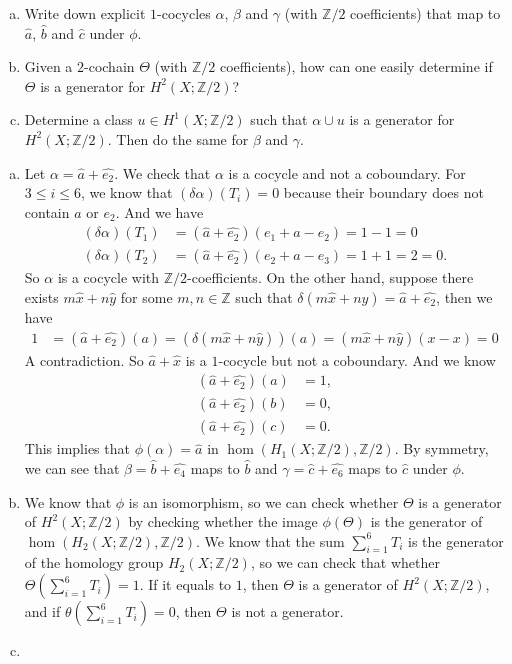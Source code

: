 \documentclass[letterpaper, 12pt]{article}
\begin{document}
\begin{problem}{6}
\begin{enumerate}[(a)]
\item Write down explicit \(1\)-cocycles \(\alpha\), \(\beta\) and \(\gamma\) (with \(\mathbb{Z}/2\) coefficients) that map to \(\hat{a}\), \(\hat{b}\) and \(\hat{c}\) under \(\phi\). 
\item Given a \(2\)-cochain \(\Theta\) (with \(\mathbb{Z}/2\) coefficients), how can one easily determine if \(\Theta\) is a generator for \(H^2(X;\mathbb{Z}/2)\)?
\item Determine a class \(u\in H^1(X;\mathbb{Z}/2)\) such that \(\alpha\cup u\) is a generator for \(H^2(X;\mathbb{Z}/2)\). Then do the same for \(\beta\) and \(\gamma\).
\end{enumerate}
\end{problem}
\begin{solution}
\begin{enumerate}[(a)]
\item Let \(\alpha=\hat{a}+\hat{e_2}\). We check that \(\alpha\) is a cocycle and not a coboundary. For \(3\leq i\leq 6\), we know that \((\delta\alpha)(T_i)=0\) because their boundary does not contain \(a\) or \(e_2\). And we have 
\begin{align*}
    (\delta\alpha)(T_1)&=(\hat{a}+\hat{e_2})(e_1+a-e_2)=1-1=0\\ 
    (\delta\alpha)(T_2)&=(\hat{a}+\hat{e_2})(e_2+a-e_3)=1+1=2=0.
\end{align*}
So \(\alpha\) is a cocycle with \(\mathbb{Z}/2\)-coefficients. On the other hand, suppose there exists \(m\hat{x}+n\hat{y}\) for some \(m,n\in \mathbb{Z}\) such that \(\delta(m\hat{x}+n\hat{y})=\hat{a}+\hat{e_2}\), then we have 
\begin{align*}
   1&=(\hat{a}+\hat{e_2})(a)=(\delta(m\hat{x}+n\hat{y}))(a)=(m\hat{x}+n\hat{y})(x-x)=0
\end{align*}
A contradiction. So \(\hat{a}+\hat{x}\) is a \(1\)-cocycle but not a coboundary. And we know 
\begin{align*}
    (\hat{a}+\hat{e_2})(a)&=1,\\
    (\hat{a}+\hat{e_2})(b)&=0,\\
    (\hat{a}+\hat{e_2})(c)&=0. 
\end{align*}
This implies that \(\phi(\alpha)=\hat{a}\) in \(\hom(H_1(X;\mathbb{Z}/2),\mathbb{Z}/2)\). By symmetry, we can see that 
\(\beta=\hat{b}+\hat{e_4}\) maps to \(\hat{b}\) and \(\gamma=\hat{c}+\hat{e_6}\) maps to \(\hat{c}\) under \(\phi\).
\item We know that \(\phi\) is an isomorphism, so we can check whether \(\Theta\) is a generator of \(H^2(X;\mathbb{Z}/2)\) by checking whether the image \(\phi(\Theta)\) is the generator of \(\hom(H_2(X;\mathbb{Z}/2),\mathbb{Z}/2)\). We know that the sum \(\sum_{i=1}^{6}T_i\) is the generator of the homology group \(H_2(X;\mathbb{Z}/2)\), so we can check that whether \(\Theta(\sum_{i=1}^{6}T_i)=1\). If it equals to \(1\), then \(\Theta\) is a generator of \(H^2(X;\mathbb{Z}/2)\), and if \(\theta(\sum_{i=1}^{6}T_i)=0\), then \(\Theta\) is not a generator.
\item  
\end{enumerate}
\end{solution}
\end{document}
